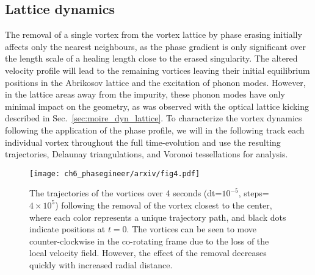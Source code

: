 \subsection{Lattice dynamics}


The removal of a single vortex from the vortex lattice by phase erasing initially affects only the nearest neighbours, as the phase gradient is only significant over the length scale of a healing length close to the erased singularity. The altered velocity profile will lead to the remaining vortices leaving their initial equilibrium positions in the Abrikosov lattice and the excitation of phonon modes. However, in the lattice areas away from the impurity, these phonon modes have only minimal impact on the geometry, as was observed with the optical lattice kicking described in Sec.~\ref{sec:moire_dyn_lattice}. To characterize the vortex dynamics following the application of the phase profile, we will in the following track each individual vortex throughout the full time-evolution and use the resulting trajectories, Delaunay triangulations, and Voronoi tessellations for analysis.

\begin{figure}\centering
\texttt{[image: ch6\_phasegineer/arxiv/fig4.pdf]}
    \caption{The trajectories of the vortices over 4 seconds (dt=$10^{-5}$, steps=$4\times 10^{5}$) following the removal of the vortex closest to the center, where each color represents a unique trajectory path, and black dots indicate positions at $t=0$. The vortices can be seen to move counter-clockwise in the co-rotating frame due to the loss of the local velocity field. However, the effect of the removal decreases quickly with increased radial distance. }
    \label{fig:trajplot}
\end{figure}


